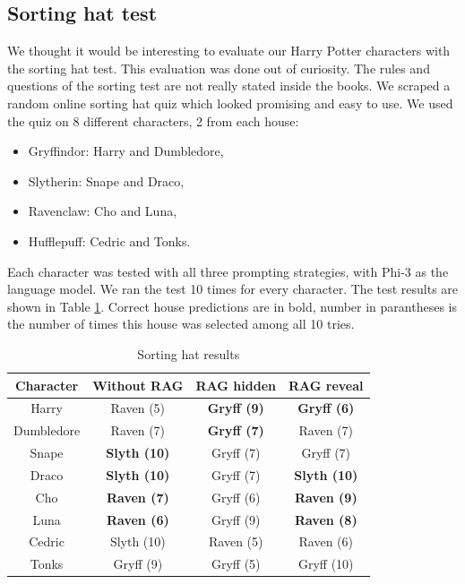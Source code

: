 \documentclass[fleqn,moreauthors,10pt]{ds_report}
\begin{document}
\subsection*{Sorting hat test}
We thought it would be interesting to evaluate our Harry Potter characters with the sorting hat test.
This evaluation was done out of curiosity. The rules and questions of the sorting test are not really stated inside the books.
We scraped a random online sorting hat quiz which looked promising and easy to use.
We used the quiz on 8 different characters, 2 from each house:
\begin{itemize}
	\item Gryffindor: Harry and Dumbledore,
	\item Slytherin: Snape and Draco,
	\item Ravenclaw: Cho and Luna,
	\item Hufflepuff: Cedric and Tonks.
\end{itemize}
Each character was tested with all three prompting strategies, with Phi-3 as the language model.
We ran the test 10 times for every character.
The test results are shown in Table \ref*{tab:sorting_hat_results}.
Correct house predictions are in bold, number in parantheses is the number of times this house was selected among all 10 tries.

\begin{table}[hbt]
	\caption{Sorting hat results}
	\centering
	\begin{tabular}{c | c | c | c }
		Character  & Without RAG         & RAG hidden         & RAG reveal          \\ \hline
		Harry      & Raven (5)           & \textbf{Gryff (9)} & \textbf{Gryff (6)}  \\
		Dumbledore & Raven (7)           & \textbf{Gryff (7)} & Raven (7)           \\ \hline
		Snape      & \textbf{Slyth (10)} & Gryff (7)          & Gryff (7)           \\
		Draco      & \textbf{Slyth (10)} & Gryff (7)          & \textbf{Slyth (10)} \\ \hline
		Cho        & \textbf{Raven (7)}  & Gryff (6)          & \textbf{Raven (9)}  \\
		Luna       & \textbf{Raven (6)}  & Gryff (9)          & \textbf{Raven (8)}  \\ \hline
		Cedric     & Slyth (10)          & Raven (5)          & Raven (6)           \\
		Tonks      & Gryff (9)           & Gryff (5)          & Gryff (10)          \\
	\end{tabular}
	\label{tab:sorting_hat_results}
\end{table}
\end{document}
